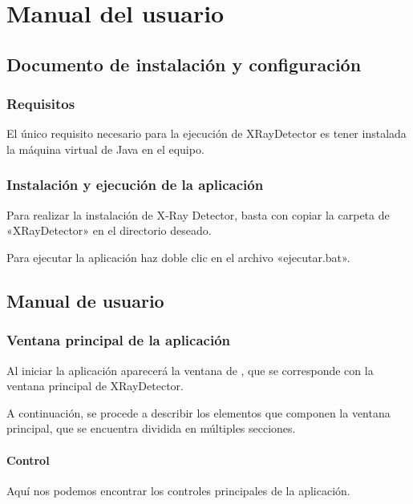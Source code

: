 \chapter{Manual del usuario}

\section{Documento de instalación y configuración}

\subsection{Requisitos}
El único requisito necesario para la ejecución de XRayDetector es tener instalada la máquina virtual de Java en el equipo.

\subsection{Instalación y ejecución de la aplicación}
Para realizar la instalación de X-Ray Detector, basta con copiar la carpeta de «XRayDetector»
en el directorio deseado.

Para ejecutar la aplicación haz doble clic en el archivo «ejecutar.bat».

\section{Manual de usuario}

\subsection{Ventana principal de la aplicación}
Al iniciar la aplicación aparecerá la ventana de , que se corresponde con la ventana principal de XRayDetector.


A continuación, se procede a describir los elementos que componen la ventana principal, que se encuentra dividida en múltiples secciones.

\subsubsection*{Control}
Aquí nos podemos encontrar los controles principales de la aplicación.

